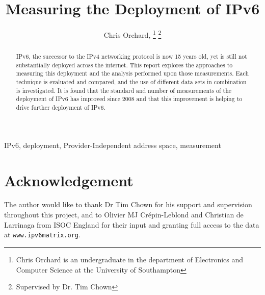 \documentclass[10pt, final, conference, a4paper]{IEEEtran}
\begin{document}
\title{Measuring the Deployment of IPv6}

\author{Chris Orchard,
\thanks{Chris Orchard is an undergraduate in the department of Electronics and
Computer Science at the University of Southampton} 
\thanks{Supervised by Dr. Tim Chown}
}


\maketitle


\begin{abstract}
IPv6, the successor to the IPv4 networking protocol is now 15 years old, yet is
still not substantially deployed across the internet. This report explores the
approaches to measuring this deployment and the analysis performed upon those
measurements. Each technique is evaluated and compared, and the use of different
data sets in combination is investigated. It is found that the standard and
number of measurements of the deployment of IPv6 has improved since 2008 and
that this improvement is helping to drive further deployment of IPv6. 
\end{abstract}

\begin{IEEEkeywords}
IPv6, deployment, Provider-Independent address space, measurement
\end{IEEEkeywords}







\section{Acknowledgement}

The author would like to thank Dr Tim Chown for his support and supervision
throughout this project, and to Olivier MJ Crépin-Leblond and Christian de
Larrinaga from ISOC England for their input and granting full access to the
data at \verb+www.ipv6matrix.org+.



{}
\end{document}
